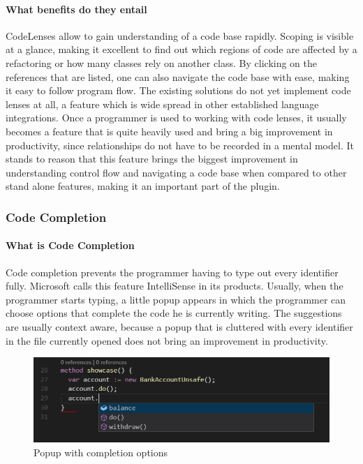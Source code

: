 \paragraph{What benefits do they entail}
CodeLenses allow to gain understanding of a code base rapidly. Scoping is visible at a glance, making it excellent to find out which regions of code are affected by a refactoring or how many classes rely on another class. By clicking on the references that are listed, one can also navigate the code base with ease, making it easy to follow program flow. \newline
The existing solutions do not yet implement code lenses at all, a feature which is wide spread in other established language integrations. Once a programmer is used to working with code lenses, it usually becomes a feature that is quite heavily used and bring a big improvement in productivity, since relationships do not have to be recorded in a mental model. It stands to reason that this feature brings the biggest improvement in understanding control flow and navigating a code base when compared to other stand alone features, making it an  important part of the plugin. \newline


\subsubsection{Code Completion} \label{agcodecompletion}

\paragraph{What is Code Completion}
Code completion prevents the programmer having to type out every identifier fully. Microsoft calls this feature IntelliSense in its products. Usually, when the programmer starts typing, a little popup appears in which the programmer can choose options that complete the code he is currently writing. The suggestions are usually context aware, because a popup that is cluttered with every identifier in the file currently opened does not bring an improvement in productivity.\newline
\begin{figure}[H]
	\centering
	\includegraphics[width=1\textwidth]{img/codeCompletionOverview}
	\caption{Popup with completion options}
	\label{fig:agcodecompletionoverview}
\end{figure}

